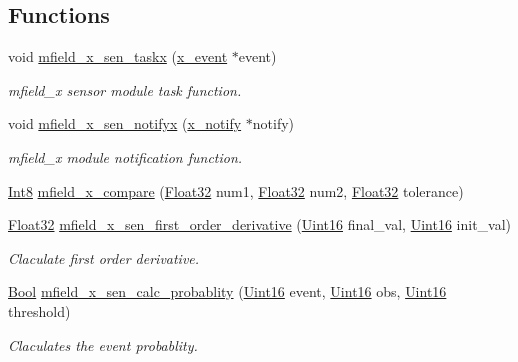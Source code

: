 \subsection*{Functions}
\begin{DoxyCompactItemize}
\item 
void \hyperlink{a00052_a72e9235043dc4a8469143a6eb48bf117}{mfield\+\_\+x\+\_\+sen\+\_\+taskx} (\hyperlink{a00036_de/d37/a00849}{x\+\_\+event} $\ast$event)
\begin{DoxyCompactList}\small\item\em mfield\+\_\+x sensor module task function. \end{DoxyCompactList}\item 
void \hyperlink{a00052_ac28a2b5f3fa92c0593446e15a63a501c}{mfield\+\_\+x\+\_\+sen\+\_\+notifyx} (\hyperlink{a00036_df/d4c/a00851}{x\+\_\+notify} $\ast$notify)
\begin{DoxyCompactList}\small\item\em mfield\+\_\+x module notification function. \end{DoxyCompactList}\item 
\hyperlink{a00072_a7e31ca7716b8d85dd473450a5c5e5a97}{Int8} \hyperlink{a00052_adf290c10214480d55f3631c1760188b0}{mfield\+\_\+x\+\_\+compare} (\hyperlink{a00072_a87d38f886e617ced2698fc55afa07637}{Float32} num1, \hyperlink{a00072_a87d38f886e617ced2698fc55afa07637}{Float32} num2, \hyperlink{a00072_a87d38f886e617ced2698fc55afa07637}{Float32} tolerance)
\item 
\hyperlink{a00072_a87d38f886e617ced2698fc55afa07637}{Float32} \hyperlink{a00052_af29e981d0d6b3a84d980170b43933dbc}{mfield\+\_\+x\+\_\+sen\+\_\+first\+\_\+order\+\_\+derivative} (\hyperlink{a00072_a59a9f6be4562c327cbfb4f7e8e18f08b}{Uint16} final\+\_\+val, \hyperlink{a00072_a59a9f6be4562c327cbfb4f7e8e18f08b}{Uint16} init\+\_\+val)
\begin{DoxyCompactList}\small\item\em Claculate first order derivative. \end{DoxyCompactList}\item 
\hyperlink{a00072_a253b248072cfc8bd812c69acd0046eed}{Bool} \hyperlink{a00052_aeb1e6622fe9af5c31bd0d17ab01dd23a}{mfield\+\_\+x\+\_\+sen\+\_\+calc\+\_\+probablity} (\hyperlink{a00072_a59a9f6be4562c327cbfb4f7e8e18f08b}{Uint16} event, \hyperlink{a00072_a59a9f6be4562c327cbfb4f7e8e18f08b}{Uint16} obs, \hyperlink{a00072_a59a9f6be4562c327cbfb4f7e8e18f08b}{Uint16} threshold)
\begin{DoxyCompactList}\small\item\em Claculates the event probablity. \end{DoxyCompactList}\item 

\end{DoxyCompactItemize}
